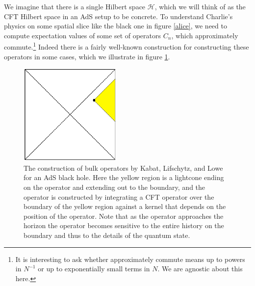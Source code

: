 \documentclass[12pt]{article}
\begin{document}
We imagine that there is a single Hilbert space $\mathcal{H}$, which we will think of as the CFT Hilbert space in an AdS setup to be concrete.  To understand Charlie's physics on some spatial slice like the black one in figure \ref{alice}, we need to compute expectation values of some set of operators $C_n$, which approximately commute.\footnote{It is interesting to ask whether approximately commute means up to powers in $N^{-1}$ or up to exponentially small terms in $N$.  We are agnostic about this here.}  Indeed there is a fairly well-known construction \cite{Kabat:2011rz} for constructing these operators in some cases, which we illustrate in figure \ref{kabat}.  
\begin{figure}
\begin{center}
\includegraphics[height=5cm]{kabat.pdf}
\end{center}
\caption{The construction of bulk operators by Kabat, Lifschytz, and Lowe for an AdS black hole.  Here the yellow region is a lightcone ending on the operator and extending out to the boundary, and the operator is constructed by integrating a CFT operator over the boundary of the yellow region against a kernel that depends on the position of the operator.  Note that as the operator approaches the horizon the operator becomes sensitive to the entire history on the boundary and thus to the details of the quantum state.}\label{kabat}
\end{figure}
\end{document}
